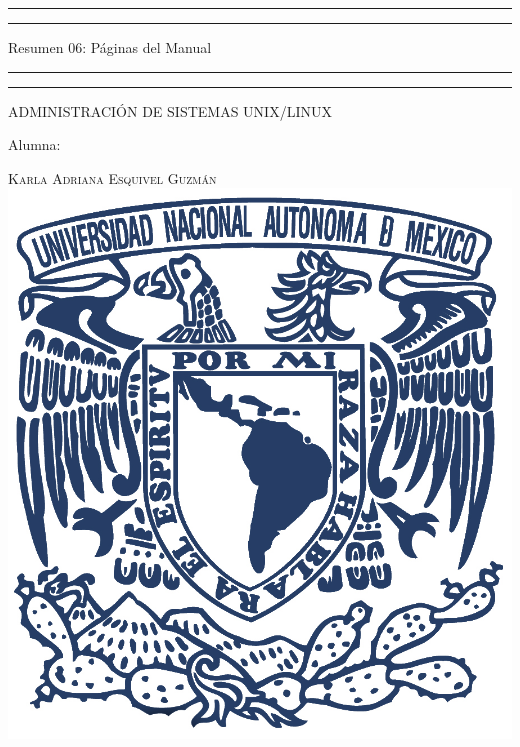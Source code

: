 \documentclass[a4paper, 11pt, oneside]{article}
\begin{document}
 

\begin{titlepage} 

	\centering 
	
	\scshape 
	
	\vspace*{\baselineskip} 
	
	
	
	\rule{\textwidth}{1.6pt}\vspace*{-\baselineskip}\vspace*{2pt} 
	\rule{\textwidth}{0.4pt} 
	
	\vspace{0.75\baselineskip} 
	
	{\LARGE Resumen 06: Páginas del Manual}	
	\vspace{0.75\baselineskip} 
	
	\rule{\textwidth}{0.4pt}\vspace*{-\baselineskip}\vspace{3.2pt}
	\rule{\textwidth}{1.6pt} 
	
	\vspace{2\baselineskip} 
	

	ADMINISTRACIÓN DE SISTEMAS UNIX/LINUX
	
	\vspace*{3\baselineskip} 
	
	
	
	Alumna:
	
	\vspace{0.5\baselineskip} 
	
	{\scshape\Large Karla Adriana Esquivel Guzmán \\} 
	\vspace{0.5\baselineskip} 
	\vfill
	\includegraphics{unam.jpg}
	

\end{titlepage}
\end{document}
